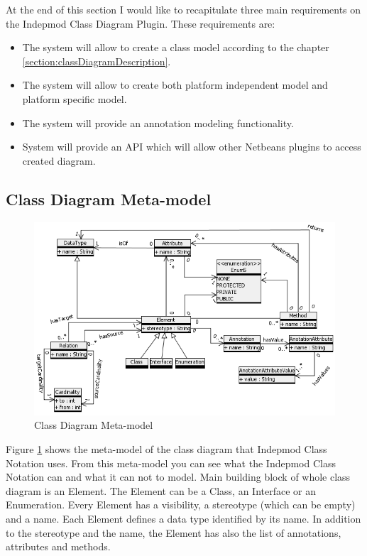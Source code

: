 At the end of this section I would like to recapitulate three main requirements on the Indepmod Class Diagram Plugin. These requirements are:
\begin{itemize}
    \item The system will allow to create a class model according to the chapter \ref{section:classDiagramDescription}.
    \item The system will allow to create both platform independent model and platform specific model.
    \item The system will provide an annotation modeling functionality.
    \item System will provide an API which will allow other Netbeans plugins to access created diagram.
\end{itemize}

\subsection{Class Diagram Meta-model}
\label{section-metamodel}

\begin{figure}[!ht]
\begin{center}
\includegraphics[width=\textwidth]{img/classDiagramMetamodel.png}
\caption{Class Diagram Meta-model}
\label{f-classDiagramMetamodel}
\end{center}
\end{figure}

Figure \ref{f-classDiagramMetamodel} shows the meta-model of the class diagram that Indepmod Class Notation uses. From this meta-model you can see what the Indepmod Class Notation can and what it can not to model. Main building block of whole class diagram is an Element. The Element can be a Class, an Interface or an Enumeration. Every Element has a visibility, a stereotype (which can be empty) and a name. Each Element defines a data type identified by its name. In addition to the stereotype and the name, the Element has also the list of annotations, attributes and methods.

